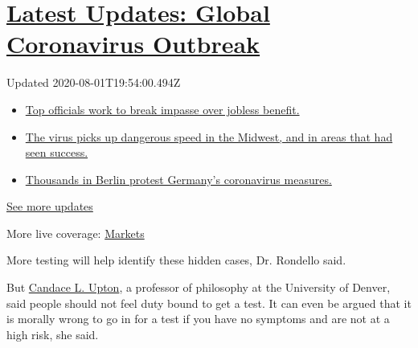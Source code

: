 \hypertarget{latest-updates-global-coronavirus-outbreak}{%
\section{\texorpdfstring{\href{https://www.nytimes3xbfgragh.onion/2020/08/01/world/coronavirus-covid-19.html?action=click\&pgtype=Article\&state=default\&region=MAIN_CONTENT_1\&context=storylines_live_updates}{Latest
Updates: Global Coronavirus
Outbreak}}{Latest Updates: Global Coronavirus Outbreak}}\label{latest-updates-global-coronavirus-outbreak}}

Updated 2020-08-01T19:54:00.494Z

\begin{itemize}
\tightlist
\item
  \href{https://www.nytimes3xbfgragh.onion/2020/08/01/world/coronavirus-covid-19.html?action=click\&pgtype=Article\&state=default\&region=MAIN_CONTENT_1\&context=storylines_live_updates\#link-3ac56579}{Top
  officials work to break impasse over jobless benefit.}
\item
  \href{https://www.nytimes3xbfgragh.onion/2020/08/01/world/coronavirus-covid-19.html?action=click\&pgtype=Article\&state=default\&region=MAIN_CONTENT_1\&context=storylines_live_updates\#link-8796723}{The
  virus picks up dangerous speed in the Midwest, and in areas that had
  seen success.}
\item
  \href{https://www.nytimes3xbfgragh.onion/2020/08/01/world/coronavirus-covid-19.html?action=click\&pgtype=Article\&state=default\&region=MAIN_CONTENT_1\&context=storylines_live_updates\#link-25930521}{Thousands
  in Berlin protest Germany's coronavirus measures.}
\end{itemize}

\href{https://www.nytimes3xbfgragh.onion/2020/08/01/world/coronavirus-covid-19.html?action=click\&pgtype=Article\&state=default\&region=MAIN_CONTENT_1\&context=storylines_live_updates}{See
more updates}

More live coverage:
\href{https://www.nytimes3xbfgragh.onion/live/2020/07/31/business/stock-market-today-coronavirus?action=click\&pgtype=Article\&state=default\&region=MAIN_CONTENT_1\&context=storylines_live_updates}{Markets}

More testing will help identify these hidden cases, Dr. Rondello said.

But
\href{https://www.du.edu/ahss/philosophy/faculty_staff/upton_candace.html}{Candace
L. Upton}, a professor of philosophy at the University of Denver, said
people should not feel duty bound to get a test. It can even be argued
that it is morally wrong to go in for a test if you have no symptoms and
are not at a high risk, she said.

